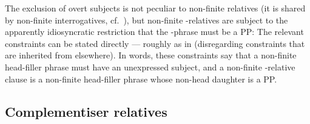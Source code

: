 \documentclass[output=paper,biblatex,babelshorthands,newtxmath,draftmode,colorlinks,citecolor=brown]{langscibook}
\begin{document}
The exclusion of overt subjects is not peculiar to non-finite relatives (it is shared by
non-finite interrogatives, cf.\ ), but non-finite -relatives are subject to the apparently
idiosyncratic restriction that the -phrase must be a PP:
\eal
\zl
The relevant constraints can be stated directly --- roughly as in 
(disregarding constraints that are inherited from elsewhere). In words, these constraints say that a non-finite
head-filler phrase must have an unexpressed subject, and a non-finite -relative
clause is a non-finite head-filler phrase whose non-head daughter is a PP.
\eal
\label{x:rc-55}
\ex {}
\ex\label{x:rc-56}
\zl
{}

\subsection{Complementiser relatives}
\label{sec:rc-comp-relatives}
\end{document}
